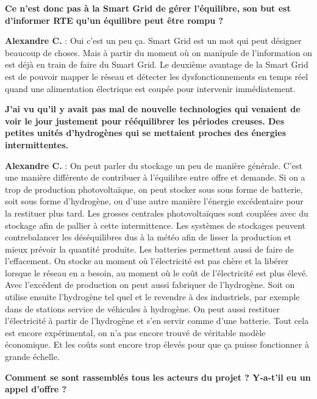 \textbf{Ce n’est donc pas à la Smart Grid de gérer l'équilibre, son but est d’informer RTE qu’un équilibre peut être rompu ?}

\textbf{Alexandre C.} :
Oui c’est un peu ça. Smart Grid est un mot qui peut désigner beaucoup de choses.
Mais à partir du moment où on manipule de l’information on est déjà en train de faire du Smart Grid.
Le deuxième avantage de la Smart Grid est de pouvoir mapper le réseau et détecter les dysfonctionnements en temps réel
quand une alimentation électrique est coupée pour intervenir immédiatement.

\textbf{J’ai vu qu’il y avait pas mal de nouvelle technologies qui venaient de voir le jour justement pour rééquilibrer les périodes creuses.
Des petites unités d’hydrogènes qui se mettaient proches des énergies intermittentes.}

\textbf{Alexandre C.} :
On peut parler du stockage un peu de manière générale.
C’est une manière différente de contribuer à l’équilibre entre offre et demande.
Si on a trop de production photovoltaïque, on peut stocker sous sous forme de batterie,
soit sous forme d’hydrogène, ou d’une autre manière l'énergie excédentaire pour la restituer plus tard.
Les grosses centrales photovoltaïques sont couplées avec du stockage afin de pallier à cette intermittence.
Les systèmes de stockages peuvent contrebalancer les déséquilibres dus à la météo afin de lisser la production et mieux prévoir la quantité produite.
Les batteries permettent aussi de faire de l’effacement.
On stocke au moment où l’électricité est pas chère et la libérer lorsque le réseau en a besoin, au moment où le coût de l’électricité est plus élevé.
Avec l'excédent de production on peut aussi fabriquer de l’hydrogène.
Soit on utilise ensuite l’hydrogène tel quel et le revendre à des industriels, par exemple dans de stations service de véhicules à hydrogène.
On peut aussi restituer l’électricité à partir de l’hydrogène et s’en servir comme d’une batterie. Tout cela est encore expérimental,
on n’a pas encore trouvé de véritable modèle économique. Et les coûts sont encore trop élevés pour que ça puisse fonctionner à grande échelle.


\textbf{Comment se sont rassemblés tous les acteurs du projet ? Y-a-t'il eu un appel d'offre ?}

